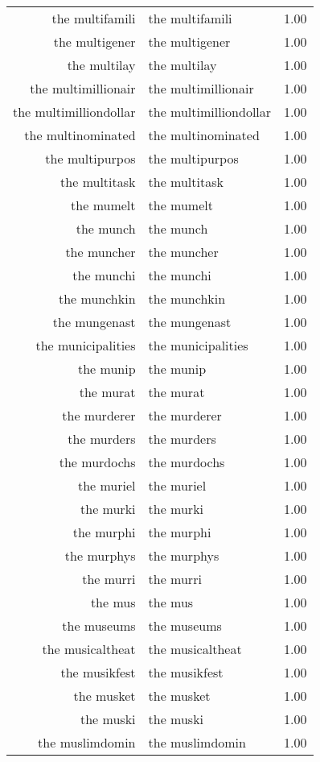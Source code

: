 \begin{table}[ht]
\begin{tabular}{rlr}
  the multifamili & the multifamili & 1.00 \\ 
  the multigener & the multigener & 1.00 \\ 
  the multilay & the multilay & 1.00 \\ 
  the multimillionair & the multimillionair & 1.00 \\ 
  the multimilliondollar & the multimilliondollar & 1.00 \\ 
  the multinominated & the multinominated & 1.00 \\ 
  the multipurpos & the multipurpos & 1.00 \\ 
  the multitask & the multitask & 1.00 \\ 
  the mumelt & the mumelt & 1.00 \\ 
  the munch & the munch & 1.00 \\ 
  the muncher & the muncher & 1.00 \\ 
  the munchi & the munchi & 1.00 \\ 
  the munchkin & the munchkin & 1.00 \\ 
  the mungenast & the mungenast & 1.00 \\ 
  the municipalities & the municipalities & 1.00 \\ 
  the munip & the munip & 1.00 \\ 
  the murat & the murat & 1.00 \\ 
  the murderer & the murderer & 1.00 \\ 
  the murders & the murders & 1.00 \\ 
  the murdochs & the murdochs & 1.00 \\ 
  the muriel & the muriel & 1.00 \\ 
  the murki & the murki & 1.00 \\ 
  the murphi & the murphi & 1.00 \\ 
  the murphys & the murphys & 1.00 \\ 
  the murri & the murri & 1.00 \\ 
  the mus & the mus & 1.00 \\ 
  the museums & the museums & 1.00 \\ 
  the musicaltheat & the musicaltheat & 1.00 \\ 
  the musikfest & the musikfest & 1.00 \\ 
  the musket & the musket & 1.00 \\ 
  the muski & the muski & 1.00 \\ 
  the muslimdomin & the muslimdomin & 1.00 \\ 

\end{tabular}
\end{table}
